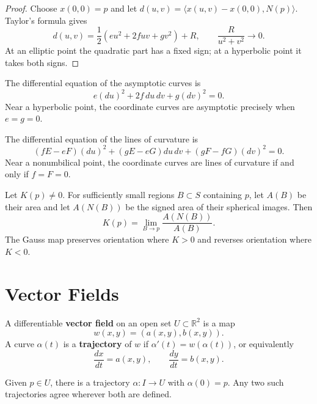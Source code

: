 \documentclass[12pt, oneside]{book}
\begin{document}
\begin{proof}
    Choose $x(0,0)=p$ and let
    $d(u,v)=\langle x(u,v)-x(0,0),N(p)\rangle$.  Taylor's formula gives
    \[
        d(u,v)=\frac12(eu^2+2fuv+gv^2)+R,
        \qquad \frac{R}{u^2+v^2}\longrightarrow0.
    \]
    At an elliptic point the quadratic part has a fixed sign; at a hyperbolic
    point it takes both signs.
\end{proof}

The differential equation of the asymptotic curves is
\begin{equation}
    e(du)^2+2f\,du\,dv+g(dv)^2=0.
    \label{eq:asymptotic-curves}
\end{equation}
Near a hyperbolic point, the coordinate curves are asymptotic precisely when
$e=g=0$.

The differential equation of the lines of curvature is
\begin{equation}
    (fE-eF)(du)^2+(gE-eG)du\,dv+(gF-fG)(dv)^2=0.
    \label{eq:curvature-lines}
\end{equation}
Near a nonumbilical point, the coordinate curves are lines of curvature if and
only if $f=F=0$.

\begin{proposition}
    Let $K(p)\neq0$.  For sufficiently small regions $B\subset S$ containing
    $p$, let $A(B)$ be their area and let $A(N(B))$ be the signed area of their
    spherical images.  Then
    \[
        K(p)=\lim_{B\to p}\frac{A(N(B))}{A(B)}.
    \]
    The Gauss map preserves orientation where $K>0$ and reverses orientation
    where $K<0$.
\end{proposition}

\section{Vector Fields}

\begin{definition}
    A differentiable \textbf{vector field} on an open set
    $U\subset\mathbb{R}^2$ is a map
    \[
        w(x,y)=(a(x,y),b(x,y)).
    \]
    A curve $\alpha(t)$ is a \textbf{trajectory} of $w$ if
    $\alpha'(t)=w(\alpha(t))$, or equivalently
    \[
        \frac{dx}{dt}=a(x,y),
        \qquad
        \frac{dy}{dt}=b(x,y).
    \]
\end{definition}

\begin{theorem}
    Given $p\in U$, there is a trajectory $\alpha:I\rightarrow U$ with
    $\alpha(0)=p$.  Any two such trajectories agree wherever both are
    defined.
\end{theorem}
\end{document}
